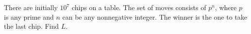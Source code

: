 There are initially $10^7$ chips on a table. The set of moves consists of $p^n$, where $p$ is any prime and $n$ can be any nonnegative integer. The winner is the one to take the last chip. Find $L$.
